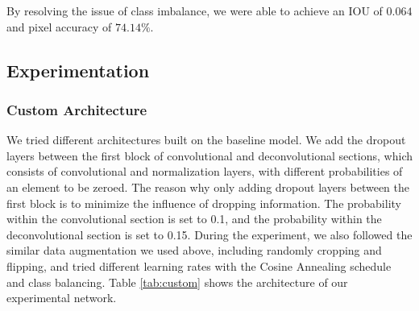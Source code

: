 \documentclass{article}
\begin{document}
 By resolving the issue of class imbalance, we were able to achieve an IOU of $0.064$ and pixel accuracy of $74.14\%$.

\subsection{Experimentation}
\subsubsection{Custom Architecture}
We tried different architectures built on the baseline model. We add the dropout layers between the first block of convolutional and deconvolutional sections, which consists of convolutional and normalization layers, with different probabilities of an element to be zeroed. The reason why only adding dropout layers between the first block is to minimize the influence of dropping information. The probability within the convolutional section is set to 0.1, and the probability within the deconvolutional section is set to 0.15. During the experiment, we also followed the similar data augmentation we used above, including randomly cropping and flipping, and tried different learning rates with the Cosine Annealing schedule and class balancing. Table \ref{tab:custom} shows the architecture of our experimental network.
\end{document}
